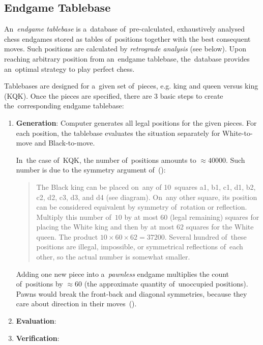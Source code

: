 \subsection{Endgame Tablebase}

An~\emph{endgame tablebase} is a~database of~pre-calculated, exhaustively analysed chess endgames stored as tables of~positions together with the best consequent moves.
Such positions are calculated by \emph{retrograde analysis} (see below).
Upon reaching arbitrary position from an~endgame tablebase, the~database provides an~optimal strategy to play perfect chess.

Tablebases are designed for a~given set of~pieces, e.g. king and queen versus king (KQK).
Once the pieces are specified, there are 3 basic steps to create the~corresponding endgame tablebase:
\begin{enumerate}[(1)]
  \item \textbf{Generation}:
    Computer generates all legal positions for the given pieces.
    For each position, the tablebase evaluates the situation separately for White-to-move and Black-to-move.

    In~the case of~KQK, the number of~positions amounts to $\approx 40000$.
    Such number is due to the symmetry argument of~(\cite{Levy2009computers}):

    \begin{quotation}
      The Black king can be placed on~any of 10~squares a1, b1, c1, d1, b2, c2, d2, c3, d3, and d4 (see \todo diagram).
      On~any other square, its position can be considered equivalent by symmetry of~rotation or reflection.
      Multiply this number of~$10$ by at most $60$ (legal remaining) squares for placing the White king and then by at most $62$ squares for the White queen.
      The product $10 \times 60 \times 62 = 37200$.
      Several hundred of~these positions are illegal, impossible, or symmetrical reflections of~each other, so the actual number is somewhat smaller.
    \end{quotation}

    Adding one new piece into a~\emph{pawnless} endgame multiplies the count of~positions by $\approx 60$ (the approximate quantity of~unoccupied positions).
    Pawns would break the front-back and diagonal symmetries, because they care about direction in their moves~(\cite{Muller2006EGTB}).

  \item \textbf{Evaluation}:

  \item \textbf{Verification}:

\end{enumerate}
\todo

